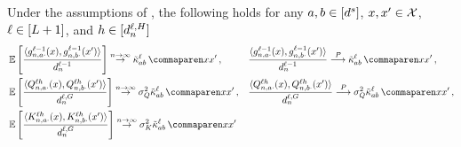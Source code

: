\begin{lemma}\label{lem:inner_prod_converge}
    Under the assumptions of , the following holds for any $a, b \in [d^s]$, $x, x' \in \mathcal{X}$, $\ell \in [L + 1]$, and $h \in [d_{n}^{\ell, H}]$
    \begin{align}
        &
        \E \left[
            \frac{
                \langle \indexedActivity{\depthSymbol - 1}{\sequenceVariable, a \cdot}{\inputSymbol} , \indexedActivity{\depthSymbol - 1}{\sequenceVariable, b \cdot}{\inputSymbol'} \rangle
            }{
                \layerDimension{\depthSymbol - 1}
            }
        \right]
        \overset{\sequenceVariable \to \infty}{\to}
        \kerntildef{a b}{\depthSymbol}{\inputSymbol}{\inputSymbol'}
        \, ,
        &&
        \frac{
            \langle \indexedActivity{\depthSymbol - 1}{\sequenceVariable, a \cdot}{\inputSymbol} , \indexedActivity{\depthSymbol - 1}{\sequenceVariable, b \cdot}{\inputSymbol'} \rangle
        }{
            \layerDimension{\depthSymbol - 1}
        }
        \convergeProb
        \kerntildef{a b}{\depthSymbol}{\inputSymbol}{\inputSymbol'}
        \, ,
        \\
        &
        \E \left[
            \frac{
                \langle \query{\sequenceVariable, a \cdot}{\depthSymbol \headIndex}(\inputSymbol) , \query{\sequenceVariable, b \cdot}{\depthSymbol \headIndex}(\inputSymbol') \rangle
            }{
                \logitDimension
            }
        \right]
        \overset{\sequenceVariable \to \infty}{\to}
        \queryVar
        \kerntildef{a b}{\depthSymbol}{\inputSymbol}{\inputSymbol'}
        \, ,
        &&
        \frac{
            \langle \query{\sequenceVariable, a \cdot}{\depthSymbol \headIndex}(\inputSymbol) , \query{\sequenceVariable, b \cdot}{\depthSymbol \headIndex}(\inputSymbol') \rangle
        }{
            \logitDimension
        }
        \convergeProb
        \queryVar
        \kerntildef{a b}{\depthSymbol}{\inputSymbol}{\inputSymbol'}
        \, ,
        \\
        &
        \E \left[
            \frac{
                \langle \key{\sequenceVariable, a \cdot}{\depthSymbol \headIndex}(\inputSymbol) , \key{\sequenceVariable, b \cdot}{\depthSymbol \headIndex}(\inputSymbol') \rangle
            }{
                \logitDimension
            }
        \right]
        \overset{\sequenceVariable \to \infty}{\to}
        \keyVar
        \kerntildef{a b}{\depthSymbol}{\inputSymbol}{\inputSymbol'}

\end{align}
\end{lemma}
